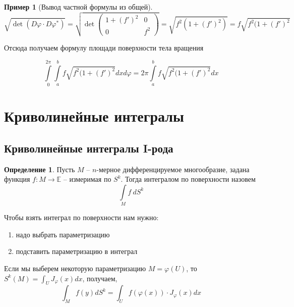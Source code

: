 \documentclass[a5paper]{article}
\newcounter{through}
\theoremstyle{plain}
\theoremstyle{definition}
\newtheorem{definition}[through]{Определение}
\newtheorem{example}[through]{Пример}
\numberwithin{through}{section}
\numberwithin{equation}{section}
\begin{document}
\begin{example}[Вывод частной формулы из общей]
	\begin{equation}
		\sqrt {\det (D \varphi \cdot D \varphi^*) } = \sqrt{\det
		\begin{pmatrix}
			1 + (f')^2 & 0 \\
			0 & f^2
		\end{pmatrix}} = \sqrt{f^2(1 + (f')^2)} = f \sqrt{f^2(1 + (f')^2}
	\end{equation}
	
	Отсюда получаем формулу площади поверхности тела вращения
	
	\begin{equation*}
		\int\limits_{0}^{2\pi} \int\limits_{a}^{b} f \sqrt{f^2(1 + (f')^2} dx d\varphi = 2\pi \int\limits_{a}^{b} f \sqrt{f^2(1 + (f')^2} dx
	\end{equation*}
\end{example}

\section{Криволинейные интегралы}
\subsection{Криволинейные интегралы I-рода}

\begin{definition}
	Пусть $M$ -- $n$-мерное дифференцируемое многообразие, задана функция
	$f: M \to \mathbb{E}$ -- измеримая по $S^k$. Тогда интегралом по поверхности назовем 
	\[ \int\limits_M f\ dS^k \]
\end{definition}

Чтобы взять интеграл по поверхности нам нужно: 
\begin{enumerate}
	\item 
	надо выбрать параметризацию
	
	\item 
	подставить параметризацию в интеграл
\end{enumerate}

Если мы выберем некоторую параметризацию $M = \varphi(U)$, то $S^k(M) = \int_U J_{\varphi}(x)dx$, получаем,
 \[ \int_M f(y)dS^k = \int_U f(\varphi(x))\cdot J_\varphi (x)dx \]
 
\end{document}
